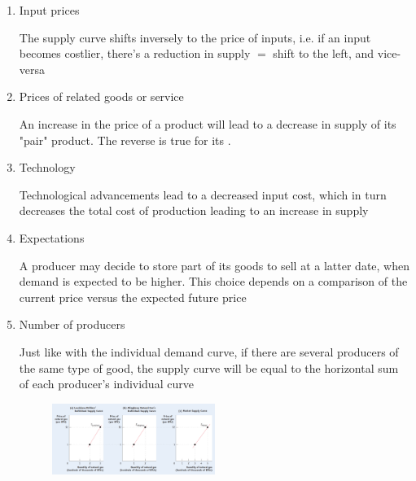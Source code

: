 \documentclass[english,course,draft]{Notes}
\begin{document}
\begin{enumerate}
	\item Input prices
	
	
	\par{The supply curve shifts inversely to the price of inputs, i.e. if an input becomes costlier, there's a reduction in supply $=$ shift to the left, and vice-versa}
	
	\item Prices of related goods or service
	
	\par{An increase in the price of a  product will lead to a decrease in supply of its "pair" product. The reverse is true for its .}
	

	\item Technology
	
	\par{Technological advancements lead to a decreased input cost, which in turn decreases the total cost of production leading to an increase in supply}
	
	\item Expectations
	
	\par{A producer may decide to store part of its goods to sell at a latter date, when demand is expected to be higher. This choice depends on a comparison of the current price versus the expected future price}
	
	\item Number of producers
	
	\par{Just like with the individual demand curve, if there are several producers of the same type of good, the supply curve will be equal to the horizontal sum of each producer's individual curve}
	
	\begin{figure}[ht]
\centering
\includegraphics[width=0.5\textwidth]{supplyIndividual}
\end{figure}

\end{enumerate}
\end{document}
